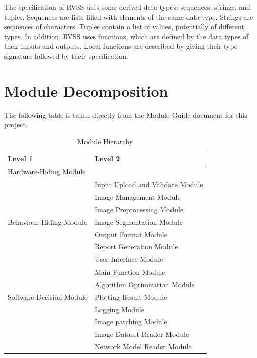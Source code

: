 \documentclass[12pt, titlepage]{article}
\begin{document}
\noindent
The specification of RVSS uses some derived data types: sequences, strings, and
tuples. Sequences are lists filled with elements of the same data type. Strings
are sequences of characters. Tuples contain a list of values, potentially of
different types. In addition, RVSS uses functions, which
are defined by the data types of their inputs and outputs. Local functions are
described by giving their type signature followed by their specification.

\section{Module Decomposition}

The following table is taken directly from the Module Guide document for this project.

\begin{table}[h!]
\centering
\begin{tabular}{p{} p{}}
\toprule
\textbf{Level 1} & \textbf{Level 2}\\
\midrule
{Hardware-Hiding Module} & ~ \\
\midrule

\multirow{7}{0.3\textwidth}{Behaviour-Hiding Module} 
& Input Upload and Validate Module\\ 
& Image Management Module\\
& Image Preprocessing Module\\
& Image Segmentation Module\\
& Output Format Module\\
& Report Generation Module\\
& User Interface Module\\
& Main Function Module\\
\midrule

\multirow{3}{0.3\textwidth}{Software Decision Module} 
& Algorithm Optimization Module\\
& Plotting Result Module\\
& Logging Module\\
& Image patching Module\\
& Image Dataset Reader Module\\
& Network Model Reader Module\\
\bottomrule

\end{tabular}
\caption{Module Hierarchy}
\label{TblMH}
\end{table}


\newpage
~\newpage
\end{document}
